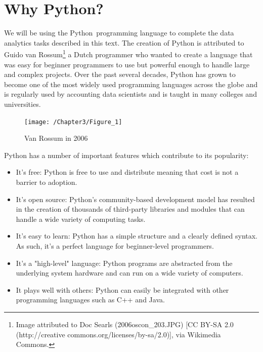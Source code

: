 \documentclass{book}
\begin{document}
\section{Why Python?}
We will be using the Python\texttrademark \ programming language to complete the data analytics tasks described in this text. The creation of Python is attributed to Guido van Rossum\footnote {Image attributed to Doc Searls (2006oscon\_203.JPG) [CC BY-SA 2.0 (http://creative commons.org/licenses/by-sa/2.0)], via Wikimedia Commons.} a Dutch programmer who wanted to create a language that was easy for beginner programmers to use but powerful enough to handle large and complex projects. Over the past several decades, Python has grown to become one of the most widely used programming languages across the globe and is regularly used by accounting data scientists and is taught in many colleges and universities. \begin{figure}[h]
	\caption{Van Rossum in 2006}
	\centering\texttt{[image: /Chapter3/Figure\_1]}
\end{figure}

Python has a number of important features which contribute to its popularity:

\begin{itemize}
	\item It's free: Python is free to use and distribute meaning that cost is not a barrier to adoption.
	\item It's open source: Python's community-based development model has resulted in the creation of thousands of third-party libraries and modules that can handle a wide variety of computing tasks. 
	\item It's easy to learn: Python has a simple structure and a clearly defined syntax. As such, it's a perfect language for beginner-level programmers.
	\item It's a "high-level" language: Python programs are abstracted from the underlying system hardware and can run on a wide variety of computers.
	\item It plays well with others: Python can easily be integrated with other programming languages such as C++ and Java.
\end{itemize}
\end{document}
